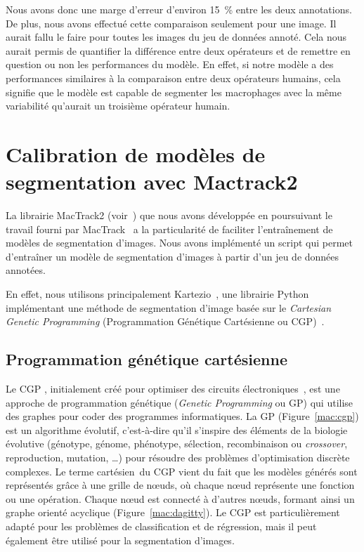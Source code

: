 \documentclass[a4paper,12pt]{report}
\renewcommand{\nameref}[1]{\textbf{\oldnameref{#1}}}
\newcommand{\figref}[1]{Figure~\ref{#1}}
\begin{document}
Nous avons donc une marge d'erreur d'environ 15~\% entre les deux annotations. De plus, nous avons effectué cette comparaison seulement pour une image. Il aurait fallu le faire pour toutes les images du jeu de données annoté. Cela nous aurait permis de quantifier la différence entre deux opérateurs et de remettre en question ou non les performances du modèle. En effet, si notre modèle a des performances similaires à la comparaison entre deux opérateurs humains, cela signifie que le modèle est capable de segmenter les macrophages avec la même variabilité qu'aurait un troisième opérateur humain.




\section{Calibration de modèles de segmentation avec Mactrack2}\label{creamodel}

La librairie MacTrack2 (voir~\nameref{code}) que nous avons développée en poursuivant le travail fourni par MacTrack~\cite{axel} a la particularité de faciliter l'entraînement de modèles de segmentation d'images. Nous avons implémenté un script qui permet d'entraîner un modèle de segmentation d'images à partir d'un jeu de données annotées.

En effet, nous utilisons principalement Kartezio~\cite{kartezio}, une librairie Python implémentant une méthode de segmentation d'image basée sur le \textit{Cartesian Genetic Programming} (Programmation Génétique Cartésienne ou CGP)~\cite{cgp}.




\subsection{Programmation génétique cartésienne}

Le CGP \cite{cgp}, initialement créé pour optimiser des circuits électroniques~\cite{circuit}, est une approche de programmation génétique \cite{gp} (\textit{Genetic Programming} ou GP) qui utilise des graphes pour coder des programmes informatiques. La GP (\figref{mac:cgp}) est un algorithme évolutif, c'est-à-dire qu'il s'inspire des éléments de la biologie évolutive (génotype, génome, phénotype, sélection, recombinaison ou \textit{crossover}, reproduction, mutation, \dots) pour résoudre des problèmes d'optimisation discrète complexes. Le terme \og cartésien\fg\ du CGP vient du fait que les modèles générés sont représentés grâce à une grille de nœuds, où chaque nœud représente une fonction ou une opération. Chaque nœud est connecté à d'autres nœuds, formant ainsi un graphe orienté acyclique (\figref{mac:dagitty}). Le CGP est particulièrement adapté pour les problèmes de classification et de régression, mais il peut également être utilisé pour la segmentation d'images.
\end{document}
